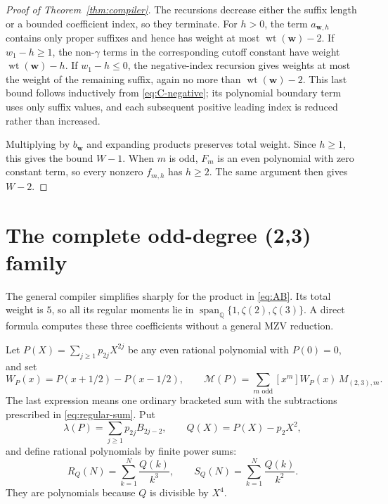 \documentclass[11pt,letterpaper]{article}
\numberwithin{equation}{section}
\theoremstyle{definition}\newtheorem{definition}[theorem]{Definition}
\theoremstyle{remark}\newtheorem{remark}[theorem]{Remark}
\DeclareMathOperator{\wt}{wt}
\newcommand{\Q}{\mathbb Q}
\begin{document}
\begin{proof}[Proof of Theorem~\ref{thm:compiler}]
The recursions decrease either the suffix length or a bounded
coefficient index, so they terminate. For $h>0$, the term
$a_{\boldsymbol w,h}$ contains only proper suffixes and hence
has weight at most $\wt(\boldsymbol w)-2$.
If $w_1-h\ge1$, the non-$\gamma$ terms in the corresponding
cutoff constant have weight $\wt(\boldsymbol w)-h$.
If $w_1-h\le0$, the negative-index recursion gives weights at
most the weight of the remaining suffix, again no more than
$\wt(\boldsymbol w)-2$. This last bound follows inductively
from \eqref{eq:C-negative}; its polynomial boundary term uses
only suffix values, and each subsequent positive leading index
is reduced rather than increased.

Multiplying by $b_{\boldsymbol w}$ and expanding products preserves
total weight. Since $h\ge1$, this gives the bound $W-1$.
When $m$ is odd, $F_m$ is an even polynomial with zero constant
term, so every nonzero $f_{m,h}$ has $h\ge2$. The same argument
then gives $W-2$.
\end{proof}

\section{The complete odd-degree (2,3) family}
\label{sec:pair}

The general compiler simplifies sharply for the product in
\eqref{eq:AB}. Its total weight is $5$, so all its regular moments
lie in $\operatorname{span}_{\Q}\{1,\zeta(2),\zeta(3)\}$.
A direct formula computes these three coefficients without a
general MZV reduction.

Let $P(X)=\sum_{j\ge1}p_{2j}X^{2j}$ be any even rational polynomial
with $P(0)=0$, and set
\[
 W_P(x)=P(x+1/2)-P(x-1/2),\qquad
 \mathscr M(P)=\sum_{m\text{ odd}}[x^m]W_P(x)\,M_{(2,3),m}.
\]
The last expression means one ordinary bracketed sum with the
subtractions prescribed in \eqref{eq:regular-sum}.
Put
\begin{equation}\label{eq:pair-L}
 \lambda(P)=\sum_{j\ge1}p_{2j}B_{2j-2},\qquad
 Q(X)=P(X)-p_2X^2,
\end{equation}
and define rational polynomials by finite power sums:
\begin{equation}\label{eq:pair-RS}
 R_Q(N)=\sum_{k=1}^N\frac{Q(k)}{k^3},\qquad
 S_Q(N)=\sum_{k=1}^N\frac{Q(k)}{k^2}.
\end{equation}
They are polynomials because $Q$ is divisible by $X^4$.
\end{document}
